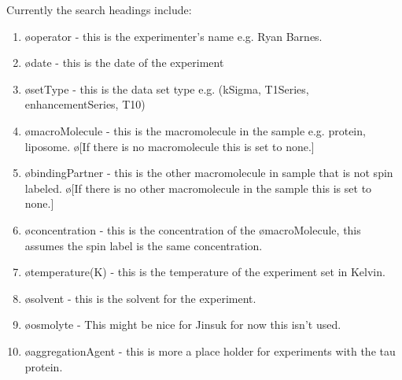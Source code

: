 \documentclass[10pt]{book}
\begin{document}
Currently the search headings include:
\begin{enumerate}
    \item \o{operator} - this is the experimenter's name e.g. Ryan Barnes.
    \item \o{date} - this is the date of the experiment
    \item \o{setType} - this is the data set type e.g. (kSigma, T1Series, enhancementSeries, T10)
    \item \o{macroMolecule} - this is the macromolecule in the sample e.g. protein, liposome. \o[If there is no macromolecule this is set to none.]{} 
    \item \o{bindingPartner} - this is the other macromolecule in sample that is not spin labeled. \o[If there is no other macromolecule in the sample this is set to none.]{} 
    \item \o{concentration} - this is the concentration of the \o{macroMolecule}, this assumes the spin label is the same concentration.
    \item \o{temperature(K)} - this is the temperature of the experiment set in Kelvin.
    \item \o{solvent} - this is the solvent for the experiment.
    \item \o{osmolyte} - This might be nice for Jinsuk for now this isn't used.
    \item \o{aggregationAgent} - this is more a place holder for experiments with the tau protein.
\end{enumerate}
\end{document}
